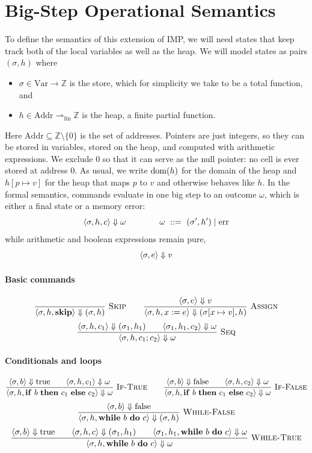 \section{Big-Step Operational Semantics}
%
To define the semantics of this extension of IMP, we will need states that keep track both of the
local variables as well as the heap. We will model states as pairs $(\sigma,h)$ where
\begin{itemize}
  \item $\sigma\in\mathrm{Var}\to\mathbb{Z}$ is the store, which for simplicity we take to be a
    total function, and
  \item $h\in\mathrm{Addr}\rightharpoonup_{\mathrm{fin}}\mathbb{Z}$ is the heap, a finite partial
    function.
\end{itemize}
Here $\mathrm{Addr}\subseteq\mathbb{Z}\setminus\{0\}$ is the set of addresses. Pointers are just
integers, so they can be stored in variables, stored on the heap, and computed with arithmetic
expressions. We exclude $0$ so that it can serve as the null pointer: no cell is ever stored at
address $0$. As usual, we write $\operatorname{dom}(h)$ for the domain of the heap and $h[p\mapsto v]$ for the
heap that maps $p$ to $v$ and otherwise behaves like $h$.
%
In the formal semantics, commands evaluate in one big step to an outcome $\omega$, which is either
a final state or a memory error:
\[
  \ev{\sigma,h,c}\sem\omega\qquad\qquad \omega\ ::=\ (\sigma',h')\mid\err
\]
while arithmetic and boolean expressions remain pure,
\[
  \langle \sigma,e\rangle\mathrel{\Downarrow} v
\]
%
\paragraph{Basic commands}
\[
  \dfrac{}{\langle \sigma,h,\mathbf{skip}\rangle\mathrel{\Downarrow}(\sigma,h)}\ \textsc{Skip}
  \qquad
  \dfrac{\langle \sigma,e\rangle\mathrel{\Downarrow} v}{\langle \sigma,h,x:=e\rangle\mathrel{\Downarrow}(\sigma[x\mapsto v],h)}\ \textsc{Assign}
\]
\[
  \dfrac{\langle \sigma,h,c_1\rangle\mathrel{\Downarrow}(\sigma_1,h_1)\qquad\langle \sigma_1,h_1,c_2\rangle\mathrel{\Downarrow}\omega}{\langle \sigma,h,c_1;c_2\rangle\mathrel{\Downarrow}\omega}\ \textsc{Seq}
\]
%
\paragraph{Conditionals and loops}
\[
  \infr{\ev{\sigma,b}\sem\mathrm{true}\qquad\ev{\sigma,h,c_1}\sem\omega}
       {\ev{\sigma,h,\kw{if}\ b\ \kw{then}\ c_1\ \kw{else}\ c_2}\sem\omega}{If-True}
  \qquad
  \infr{\ev{\sigma,b}\sem\mathrm{false}\qquad\ev{\sigma,h,c_2}\sem\omega}
       {\ev{\sigma,h,\kw{if}\ b\ \kw{then}\ c_1\ \kw{else}\ c_2}\sem\omega}{If-False}
\]
\[
  \infr{\ev{\sigma,b}\sem\mathrm{false}}
       {\ev{\sigma,h,\kw{while}\ b\ \kw{do}\ c}\sem(\sigma,h)}{While-False}
\]
\[
  \infr{\ev{\sigma,b}\sem\mathrm{true}\qquad\ev{\sigma,h,c}\sem(\sigma_1,h_1)\qquad
        \ev{\sigma_1,h_1,\kw{while}\ b\ \kw{do}\ c}\sem\omega}
       {\ev{\sigma,h,\kw{while}\ b\ \kw{do}\ c}\sem\omega}{While-True}
\]
%
